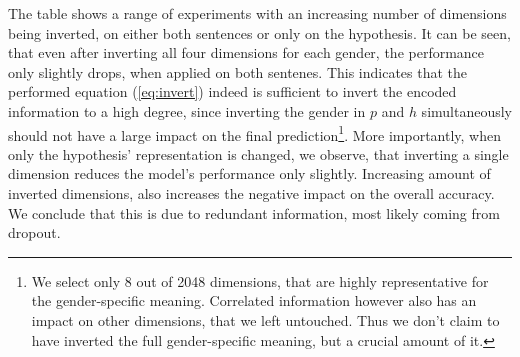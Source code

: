 The table shows a range of experiments with an increasing number of dimensions being inverted, on either both sentences or only on the hypothesis. It can be seen, that even after inverting all four dimensions for each gender, the performance only slightly drops, when applied on both sentenes. This indicates that the performed equation (\ref{eq:invert}) indeed is sufficient to invert the encoded information to a high degree, since inverting the gender in $p$ and $h$ simultaneously should not have a large impact on the final prediction\footnote{We select only 8 out of 2048 dimensions, that are highly representative for the gender-specific meaning. Correlated information however also has an impact on other dimensions, that we left untouched. Thus we don't claim to have inverted the full gender-specific meaning, but a crucial amount of it.}. More importantly, when only the hypothesis' representation is changed, we observe, that inverting a single dimension reduces the model's performance only slightly. Increasing amount of inverted dimensions, also increases the negative impact on the overall accuracy. We conclude that this is due to redundant information, most likely coming from dropout. 
